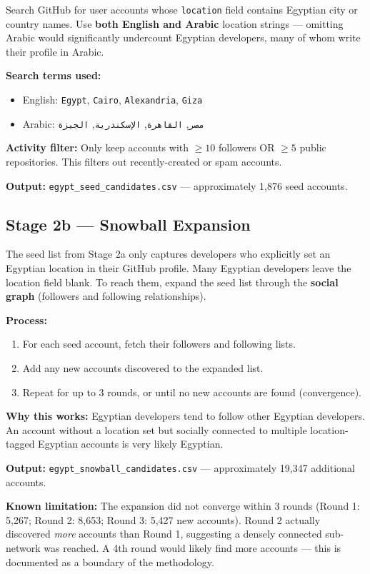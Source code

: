 \documentclass[11pt,a4paper]{article}
\begin{document}
Search GitHub for user accounts whose \texttt{location} field contains Egyptian city or country names. Use \textbf{both English and Arabic} location strings — omitting Arabic would significantly undercount Egyptian developers, many of whom write their profile in Arabic.

\textbf{Search terms used:}
\begin{itemize}
    \item English: \texttt{Egypt}, \texttt{Cairo}, \texttt{Alexandria}, \texttt{Giza}
    \item Arabic: \texttt{مصر}, \texttt{القاهرة}, \texttt{الإسكندرية}, \texttt{الجيزة}
\end{itemize}

\textbf{Activity filter:} Only keep accounts with $\geq10$ followers OR $\geq5$ public repositories. This filters out recently-created or spam accounts.

\textbf{Output:} \texttt{egypt\_seed\_candidates.csv} — approximately 1,876 seed accounts.

\subsection{Stage 2b — Snowball Expansion}

The seed list from Stage 2a only captures developers who explicitly set an Egyptian location in their GitHub profile. Many Egyptian developers leave the location field blank. To reach them, expand the seed list through the \textbf{social graph} (followers and following relationships).

\textbf{Process:}
\begin{enumerate}
    \item For each seed account, fetch their followers and following lists.
    \item Add any new accounts discovered to the expanded list.
    \item Repeat for up to 3 rounds, or until no new accounts are found (convergence).
\end{enumerate}

\textbf{Why this works:} Egyptian developers tend to follow other Egyptian developers. An account without a location set but socially connected to multiple location-tagged Egyptian accounts is very likely Egyptian.

\textbf{Output:} \texttt{egypt\_snowball\_candidates.csv} — approximately 19,347 additional accounts.

\textbf{Known limitation:} The expansion did not converge within 3 rounds (Round 1: 5,267; Round 2: 8,653; Round 3: 5,427 new accounts). Round 2 actually discovered \textit{more} accounts than Round 1, suggesting a densely connected sub-network was reached. A 4th round would likely find more accounts — this is documented as a boundary of the methodology.
\end{document}
